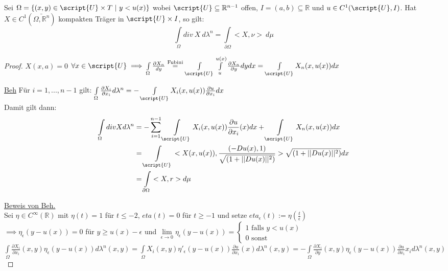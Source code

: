 \begin{lemma}
  Sei $\Omega = \{(x,y) \in \script{U} \times T \ | \ y<u(x)\}$ wobei $\script{U} \subseteq \mathbb{R}^{n-1}$ offen, $I = (a,b) \subseteq \mathbb{R}$ und $u \in C^1(\script{U}, I)$. Hat $X \in C^1(\bar{\Omega, \mathbb{R}^n})$ kompakten Träger in $\script{U}\times I$, so gilt:
  $$\int\limits_{\Omega} div \ X \ d\lambda^n = \int\limits_{\partial \Omega} <X, \nu> \ d\mu$$
\end{lemma}
\begin{proof}
  $X(x,a) = 0$ $\forall x\in \script{U} \implies \int\limits_\Omega \frac{\partial X_n}{dy} \overset{\text{Fubini}}{=} \int\limits_{\script{U}}\int\limits_u^{u(x)} \frac{\partial X_n}{\partial y} dy dx = \int\limits_{\script{U}} X_n(x,u(x)) dx$ \\
  \item[\underline{Beh}] Für $i=1,...,n-1$ gilt: $\int\limits_\Omega \frac{\partial X_i}{\partial x_i} d\lambda^n = - \int\limits_{\script{U}} X_i(x,u(x))\frac{\partial u}{\partial x_i}dx$ \\
  Damit gilt dann: 
  \begin{align*}
  	\int\limits_\Omega div X d\lambda^n &= -\sum\limits_{i=1}^{n-1} \int \limits_{\script{U}} X_i(x,u(x)) \frac{\partial u}{\partial x_i}(x) dx + \int\limits_{\script{U}} X_n(x,u(x)) dx \\
  	&= \int\limits_{\script{U}} <X(x,u(x)), \frac{(-Du(x),1)}{\sqrt{(1+||Du(x)||^2)}} > \sqrt{(1+||Du(x)||^2)}dx \\
  	&= \int\limits_{\partial\Omega} <X,r> d\mu 
  \end{align*}
  \item[] \underline{Beweis von Beh.} \\
  Sei $\eta \in C^\infty(\mathbb{R})$ mit $\eta(t) = 1$ für $t \leq -2$, $eta(t) = 0$ für $t\geq -1$ und setze $eta_\epsilon (t):= \eta(\frac{t}{\epsilon})$ \\
  $\implies \eta_\epsilon(y-u(x)) = 0$ für $y \geq u(x) - \epsilon$ und $\lim\limits_{\epsilon\to 0} \eta_\epsilon(y-u(x)) = \begin{cases} 1 \text{ falls } y < u(x) \\ 0 \text{ sonst} \end{cases}$ \\
  $\int\limits_\Omega \frac{\partial X_i}{\partial x_i} (x,y) \eta_\epsilon(y-u(x)) d\lambda^n(x,y) = \int\limits_\Omega X_i(x,y) \eta'_\epsilon(y-u(x)) \frac{\partial u}{\partial x_i}(x)d\lambda^n(x,y) = -\int\limits_\Omega \frac{\partial X_i}{\partial y}(x,y) \eta_\epsilon(y-u(x)) \frac{\partial u}{\partial x_i}x_i d\lambda^n(x,y) $ \\

\end{proof}

